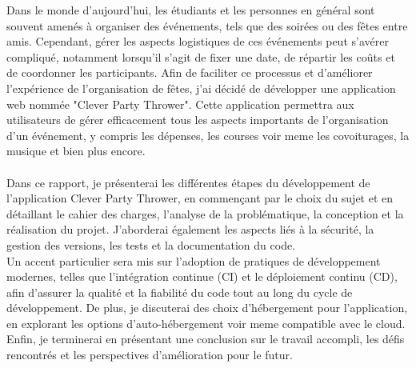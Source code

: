 

Dans le monde d'aujourd'hui, les étudiants et les personnes en général sont souvent amenés à organiser des événements, tels que des soirées ou des fêtes entre amis.
Cependant, gérer les aspects logistiques de ces événements peut s'avérer compliqué, notamment lorsqu'il s'agit de fixer une date, de répartir les coûts et de coordonner les participants.
Afin de faciliter ce processus et d'améliorer l'expérience de l'organisation de fêtes, j'ai décidé de développer une application web nommée "Clever Party Thrower".
Cette application permettra aux utilisateurs de gérer efficacement tous les aspects importants de l'organisation d'un événement,
y compris les dépenses, les courses voir meme les covoiturages, la musique et bien plus encore.\\\\

Dans ce rapport, je présenterai les différentes étapes du développement de l'application Clever Party Thrower,
en commençant par le choix du sujet et en détaillant le cahier des charges, l'analyse de la problématique, la conception et la réalisation du projet.
J'aborderai également les aspects liés à la sécurité, la gestion des versions, les tests et la documentation du code.\\
Un accent particulier sera mis sur l'adoption de pratiques de développement modernes, telles que l'intégration continue (CI) et le déploiement continu (CD), afin d'assurer la qualité et la fiabilité du code tout au long du cycle de développement.
De plus, je discuterai des choix d'hébergement pour l'application, en explorant les options d'auto-hébergement voir meme compatible avec le cloud.\\

Enfin, je terminerai en présentant une conclusion sur le travail accompli, les défis rencontrés et les perspectives d'amélioration pour le futur.